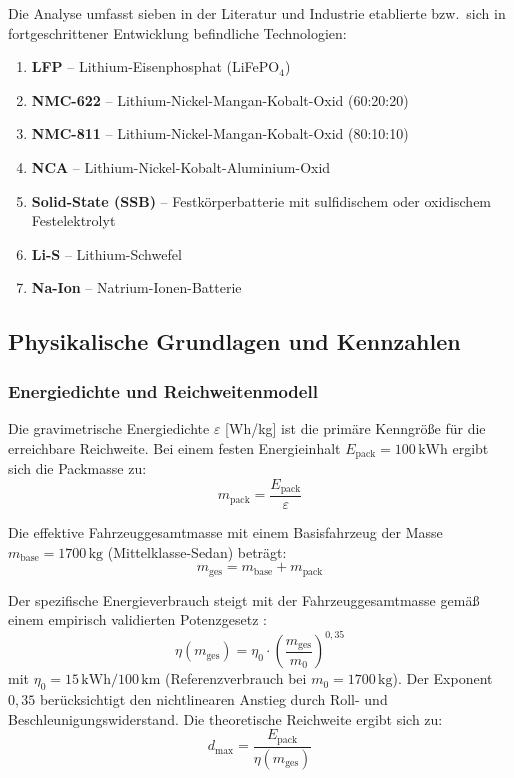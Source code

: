 ﻿\documentclass[12pt,a4paper]{article}
\begin{document}
	Die Analyse umfasst sieben in der Literatur und Industrie etablierte
	bzw.\ sich in fortgeschrittener Entwicklung befindliche Technologien:

	\begin{enumerate}
		\item \textbf{LFP} -- Lithium-Eisenphosphat (LiFePO$_4$)
		\item \textbf{NMC-622} -- Lithium-Nickel-Mangan-Kobalt-Oxid (60:20:20)
		\item \textbf{NMC-811} -- Lithium-Nickel-Mangan-Kobalt-Oxid (80:10:10)
		\item \textbf{NCA} -- Lithium-Nickel-Kobalt-Aluminium-Oxid
		\item \textbf{Solid-State (SSB)} -- Festkörperbatterie mit sulfidischem
		      oder oxidischem Festelektrolyt
		\item \textbf{Li-S} -- Lithium-Schwefel
		\item \textbf{Na-Ion} -- Natrium-Ionen-Batterie
	\end{enumerate}

	\subsection{Physikalische Grundlagen und Kennzahlen}

	\subsubsection{Energiedichte und Reichweitenmodell}

	Die gravimetrische Energiedichte $\varepsilon$ [Wh/kg] ist die
	primäre Kenngröße für die erreichbare Reichweite. Bei einem festen
	Energieinhalt $E_{\mathrm{pack}} = 100\,\mathrm{kWh}$ ergibt sich
	die Packmasse zu:
	\begin{equation}
		m_{\mathrm{pack}} = \frac{E_{\mathrm{pack}}}{\varepsilon}
		\label{eq:pack_mass}
	\end{equation}

	Die effektive Fahrzeuggesamtmasse mit einem Basisfahrzeug der Masse
	$m_{\mathrm{base}} = 1700\,\mathrm{kg}$ (Mittelklasse-Sedan) beträgt:
	\begin{equation}
		m_{\mathrm{ges}} = m_{\mathrm{base}} + m_{\mathrm{pack}}
		\label{eq:total_mass}
	\end{equation}

	Der spezifische Energieverbrauch steigt mit der Fahrzeuggesamtmasse
	gemäß einem empirisch validierten Potenzgesetz \cite{EV_Tesla2023}:
	\begin{equation}
		\eta(m_{\mathrm{ges}}) = \eta_0 \cdot
		\left(\frac{m_{\mathrm{ges}}}{m_0}\right)^{0{,}35}
		\label{eq:efficiency_mass}
	\end{equation}
	mit $\eta_0 = 15\,\mathrm{kWh}/100\,\mathrm{km}$ (Referenzverbrauch bei
	$m_0 = 1700\,\mathrm{kg}$). Der Exponent $0{,}35$ berücksichtigt den
	nichtlinearen Anstieg durch Roll- und Beschleunigungswiderstand.
	Die theoretische Reichweite ergibt sich zu:
	\begin{equation}
		\boxed{d_{\mathrm{max}} = \frac{E_{\mathrm{pack}}}{\eta(m_{\mathrm{ges}})}}
		\label{eq:range}
	\end{equation}
\end{document}
